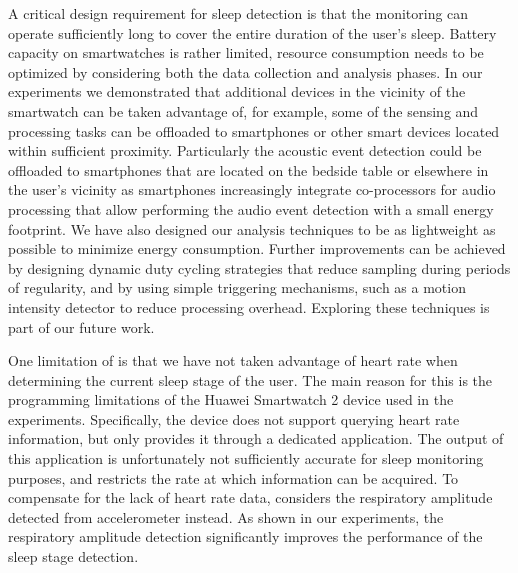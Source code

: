  A critical design requirement for sleep detection is that the monitoring can operate sufficiently long to cover the entire duration of the user's sleep. Battery capacity on smartwatches is rather limited, resource consumption needs to be optimized by considering both the data collection and analysis phases. In our experiments we demonstrated that additional devices in the vicinity of the smartwatch can be taken advantage of, for example, some of the sensing and processing tasks can be offloaded to smartphones or other smart devices located within sufficient proximity. Particularly the acoustic event detection could be offloaded to smartphones that are located on the bedside table or elsewhere in the user's vicinity as smartphones increasingly integrate co-processors for audio processing that allow performing the audio event detection with a small energy footprint. We have also designed our analysis techniques to be as lightweight as possible to minimize energy consumption. Further improvements can be achieved by designing dynamic duty cycling strategies that reduce sampling during periods of regularity, and by using simple triggering mechanisms, such as a motion intensity detector to reduce processing overhead. Exploring these techniques is part of our future work.


 One limitation of {\systemname} is that we have not taken advantage of heart rate when determining the current sleep stage of the user. The main reason for this is the programming limitations of the Huawei Smartwatch 2 device used in the experiments. Specifically, the device does not support querying heart rate information, but only provides it through a dedicated application. The output of this application is unfortunately not sufficiently accurate for sleep monitoring purposes, and restricts the rate at which information can be acquired. To compensate for the lack of heart rate data, {\systemname} considers the respiratory amplitude detected from accelerometer instead. As shown in our experiments, the respiratory amplitude detection significantly improves the performance of the sleep stage detection.

